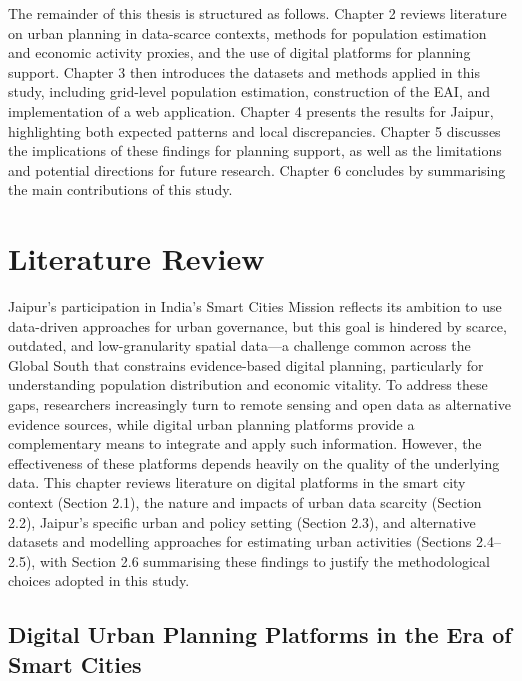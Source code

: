 \documentclass[
  12pt,
  oneside]{book}
\begin{document}
The remainder of this thesis is structured as follows. Chapter 2 reviews literature on urban planning in data-scarce contexts, methods for population estimation and economic activity proxies, and the use of digital platforms for planning support. Chapter 3 then introduces the datasets and methods applied in this study, including grid-level population estimation, construction of the EAI, and implementation of a web application. Chapter 4 presents the results for Jaipur, highlighting both expected patterns and local discrepancies. Chapter 5 discusses the implications of these findings for planning support, as well as the limitations and potential directions for future research. Chapter 6 concludes by summarising the main contributions of this study.

\chapter{Literature Review}\label{LR}

Jaipur's participation in India's Smart Cities Mission reflects its ambition to use data-driven approaches for urban governance, but this goal is hindered by scarce, outdated, and low-granularity spatial data---a challenge common across the Global South that constrains evidence-based digital planning, particularly for understanding population distribution and economic vitality. To address these gaps, researchers increasingly turn to remote sensing and open data as alternative evidence sources, while digital urban planning platforms provide a complementary means to integrate and apply such information. However, the effectiveness of these platforms depends heavily on the quality of the underlying data. This chapter reviews literature on digital platforms in the smart city context (Section 2.1), the nature and impacts of urban data scarcity (Section 2.2), Jaipur's specific urban and policy setting (Section 2.3), and alternative datasets and modelling approaches for estimating urban activities (Sections 2.4--2.5), with Section 2.6 summarising these findings to justify the methodological choices adopted in this study.

\section{Digital Urban Planning Platforms in the Era of Smart Cities}\label{digital-urban-planning-platforms-in-the-era-of-smart-cities}
\end{document}
